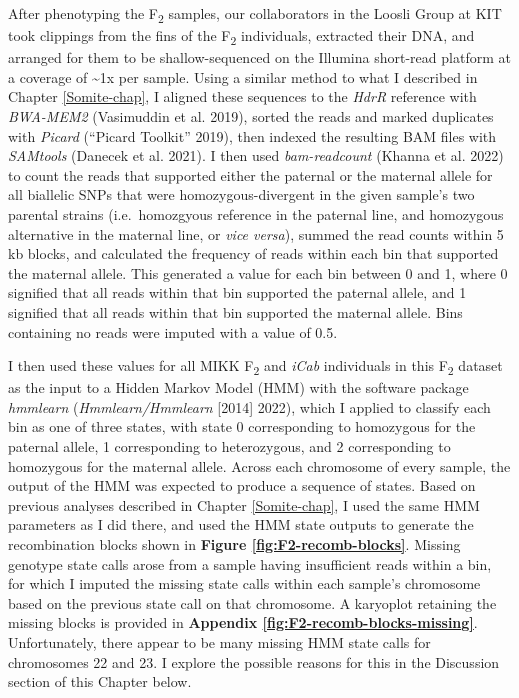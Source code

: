 \documentclass[
]{book}
\begin{document}
After phenotyping the F\textsubscript{2} samples, our collaborators in the Loosli Group at KIT took clippings from the fins of the F\textsubscript{2} individuals, extracted their DNA, and arranged for them to be shallow-sequenced on the Illumina short-read platform at a coverage of \textasciitilde1x per sample. Using a similar method to what I described in Chapter \ref{Somite-chap}, I aligned these sequences to the \emph{HdrR} reference with \emph{BWA-MEM2} (Vasimuddin et al. 2019), sorted the reads and marked duplicates with \emph{Picard} ({``Picard Toolkit''} 2019), then indexed the resulting BAM files with \emph{SAMtools} (Danecek et al. 2021). I then used \emph{bam-readcount} (Khanna et al. 2022) to count the reads that supported either the paternal or the maternal allele for all biallelic SNPs that were homozygous-divergent in the given sample's two parental strains (i.e.~homozgyous reference in the paternal line, and homozygous alternative in the maternal line, or \emph{vice versa}), summed the read counts within 5 kb blocks, and calculated the frequency of reads within each bin that supported the maternal allele. This generated a value for each bin between 0 and 1, where 0 signified that all reads within that bin supported the paternal allele, and 1 signified that all reads within that bin supported the maternal allele. Bins containing no reads were imputed with a value of 0.5.

I then used these values for all MIKK F\textsubscript{2} and \emph{\textcolor{iCab_424B4D}{iCab}} individuals in this F\textsubscript{2} dataset as the input to a Hidden Markov Model (HMM) with the software package \emph{hmmlearn} (\emph{Hmmlearn/Hmmlearn} {[}2014{]} 2022), which I applied to classify each bin as one of three states, with state 0 corresponding to homozygous for the paternal allele, 1 corresponding to heterozygous, and 2 corresponding to homozygous for the maternal allele. Across each chromosome of every sample, the output of the HMM was expected to produce a sequence of states. Based on previous analyses described in Chapter \ref{Somite-chap}, I used the same HMM parameters as I did there, and used the HMM state outputs to generate the recombination blocks shown in \textbf{Figure \ref{fig:F2-recomb-blocks}}. Missing genotype state calls arose from a sample having insufficient reads within a bin, for which I imputed the missing state calls within each sample's chromosome based on the previous state call on that chromosome. A karyoplot retaining the missing blocks is provided in \textbf{Appendix \ref{fig:F2-recomb-blocks-missing}}. Unfortunately, there appear to be many missing HMM state calls for chromosomes 22 and 23. I explore the possible reasons for this in the Discussion section of this Chapter below.
\end{document}
